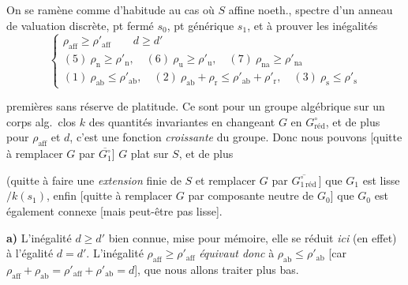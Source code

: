 \documentclass[11pt,a4paper]{article}
\begin{document}
On se ramène comme d'habitude au cas où $S$ affine
noeth., spectre d'un anneau de valuation discrète, pt fermé $s_0$, pt
générique $s_1$, et à prouver les inégalités
\[
  \left\{
  \begin{array}{l}
    \rho_{\mathrm{aff}} \geqslant \rho'_{\mathrm{aff}} \qquad
      d \geqslant d' \\[2pt]
    (5)\ \rho_{\mathrm{n}} \geqslant \rho'_{\mathrm{n}}, \quad
    (6)\ \rho_{\mathrm{u}} \geqslant \rho'_{\mathrm{u}}, \quad
    (7)\ \rho_{\mathrm{na}} \geqslant \rho'_{\mathrm{na}} \\[4pt]
    (1)\ \rho_{\mathrm{ab}} \leqslant \rho'_{\mathrm{ab}}, \quad
    (2)\ \rho_{\mathrm{ab}} + \rho_{\mathrm{r}} \leqslant \rho'_{\mathrm{ab}}
      + \rho'_{\mathrm{r}}, \quad
    (3)\ \rho_{\mathrm{s}} \leqslant \rho'_{\mathrm{s}}
  \end{array}
  \right.
\]

\struck{\ill{}} \add{\ill{}}  premières sans réserve de
platitude. Ce sont  pour un groupe algébrique sur un corps
alg.\ clos $k$ des quantités invariantes en changeant $G$ en
$G_{\mathrm{réd}}^{\circ}$, et de plus pour $\rho_{\mathrm{aff}}$ et $d$,
c'est une fonction \emph{croissante} du groupe. Donc \ill{} nous pouvons
[quitte à remplacer $G$ par $\overline{G_1^{\circ}}$] 
  \emph{} $G$
plat sur $S$, et de plus


(quitte à faire une \emph{extension} finie de $S$ et
remplacer $G$ par $\overline{G_{1\,\mathrm{réd}}^{\circ}}$\,]
que $G_1$ est  lisse$/k(s_1)$, enfin [quitte à remplacer
$G$ par  composante neutre de $G_0$] que $G_0$ est
également connexe [mais peut-être pas lisse].
\note{le « [ » ouvrant du premier crochet est à la fin de la page 31}

\textbf{a)} L'inégalité $d \geqslant d'$ bien connue, mise pour mémoire,
elle se réduit \emph{ici} (en effet) à l'égalité $d = d'$.
L'inégalité $\rho_{\mathrm{aff}} \geqslant \rho'_{\mathrm{aff}}$
\emph{équivaut donc} à $\rho_{\mathrm{ab}} \leqslant
\rho'_{\mathrm{ab}}$ [car $\rho_{\mathrm{aff}} + \rho_{\mathrm{ab}} =
\rho'_{\mathrm{aff}} + \rho'_{\mathrm{ab}} = d$], que nous
allons traiter plus bas.
\end{document}
